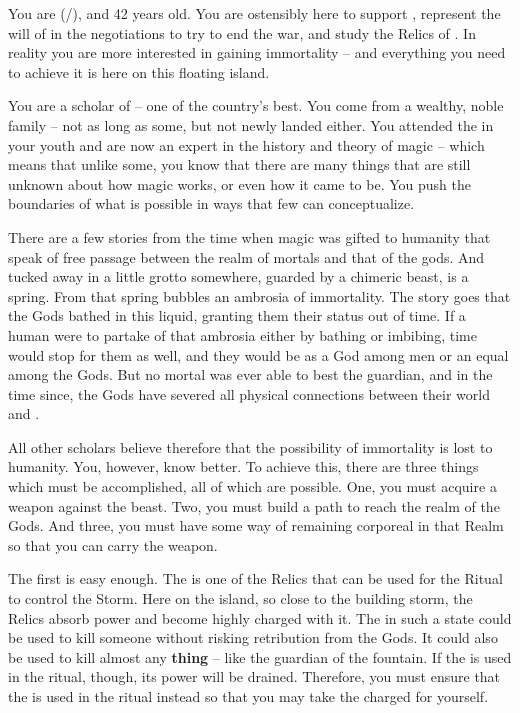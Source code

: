 \documentclass[char]{GL2020}
\begin{document}
\name{\cWildCard{}}

You are \cWildCard{\full} (\cWildCard{\they}/\cWildCard{\them}), and 42 years old. You are ostensibly here to support \cEvil{}, represent the will of \cQueen{\Majesty} \cQueen{} in the negotiations to try to end the war, and study the Relics of \pEarth{}. In reality you are more interested in gaining immortality -- and everything you need to achieve it is here on this floating island.

You are a scholar of \pFarm{} -- one of the country’s best. You come from a wealthy, noble family -- not as long as some, but not newly landed either. You attended the \pSchool{} in your youth and are now an expert in the history and theory of magic -- which means that unlike some, you know that there are many things that are still unknown about how magic works, or even how it came to be. You push the boundaries of what is possible in ways that few can conceptualize.

There are a few stories from the time when magic was gifted to humanity that speak of free passage between the realm of mortals and that of the gods. And tucked away in a little grotto somewhere, guarded by a chimeric beast, is a spring. From that spring bubbles an ambrosia of immortality. The story goes that the Gods bathed in this liquid, granting them their status out of time. If a human were to partake of that ambrosia either by bathing or imbibing, time would stop for them as well, and they would be as a God among men or an equal among the Gods. But no mortal was ever able to best the guardian, and in the time since, the Gods have severed all physical connections between their world and \pEarth{}.

All other scholars believe therefore that the possibility of immortality is lost to humanity. You, however, know better. To achieve this, there are three things which must be accomplished, all of which are possible. One, you must acquire a weapon against the beast. Two, you must build a path to reach the realm of the Gods.  And three, you must have some way of remaining corporeal in that Realm so that you can carry the weapon.

The first is easy enough. The \iScythe{} is one of the \pFarm{} Relics that can be used for the Ritual to control the Storm. Here on the island, so close to the building storm, the Relics absorb power and become highly charged with it. The \iScythe{} in such a state could be used to kill someone without risking retribution from the Gods. It could also be used to kill almost any \textbf{thing} -- like the guardian of the fountain. If the \iScythe{} is used in the ritual, though, its power will be drained. Therefore, you must ensure that the \iPitcher{} is used in the ritual instead so that you may take the charged \iScythe{} for yourself.
\end{document}
